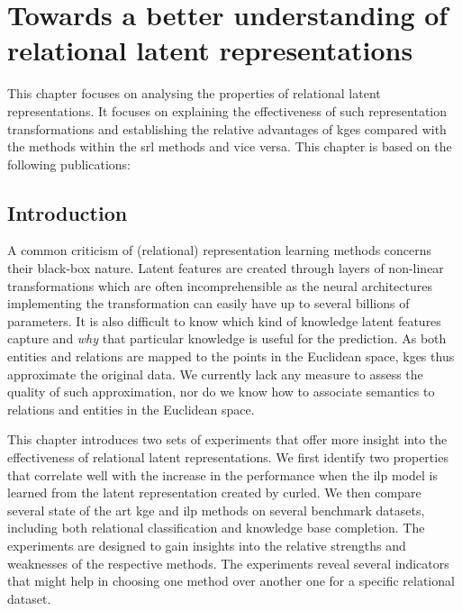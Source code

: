 \chapter{Towards a better understanding of relational latent representations}\label{ch:embeddinganalysis}


This chapter focuses on analysing the properties of relational latent representations.
It focuses on explaining the effectiveness of such representation transformations and establishing the relative advantages of \gls{kge}s compared with the methods within the \gls{srl} methods and vice versa.
This chapter is based on the following publications:

\begin{quote}
\end{quote}


\begin{quote}
\end{quote}

\begin{quote}
\end{quote}

\section{Introduction}





A common criticism of  (relational) representation learning methods concerns their black-box nature.
Latent features are created through layers of non-linear transformations which are often incomprehensible as the neural architectures implementing the transformation can easily have up to several billions of parameters.
It is also difficult to know which kind of knowledge latent features capture and \textit{why} that particular knowledge is useful for the prediction.
As both entities and relations are mapped to the points in the Euclidean space, \gls{kge}s thus approximate the original data.
We currently lack any measure to assess the quality of such approximation, nor do we know how to associate semantics to relations and entities in the Euclidean space.



This chapter introduces two sets of experiments that offer more insight into the effectiveness of relational latent representations.
We first identify two properties that correlate well with the increase in the performance when the \gls{ilp} model is learned from the latent representation created by \gls{curled}.
We then compare several state of the art \gls{kge} and \gls{ilp} methods on several benchmark datasets, including both relational classification and knowledge base completion.
The experiments are designed to gain insights into the relative strengths and weaknesses of the respective methods.
The experiments reveal several indicators that might help in choosing one method over another one for a specific  relational dataset.






